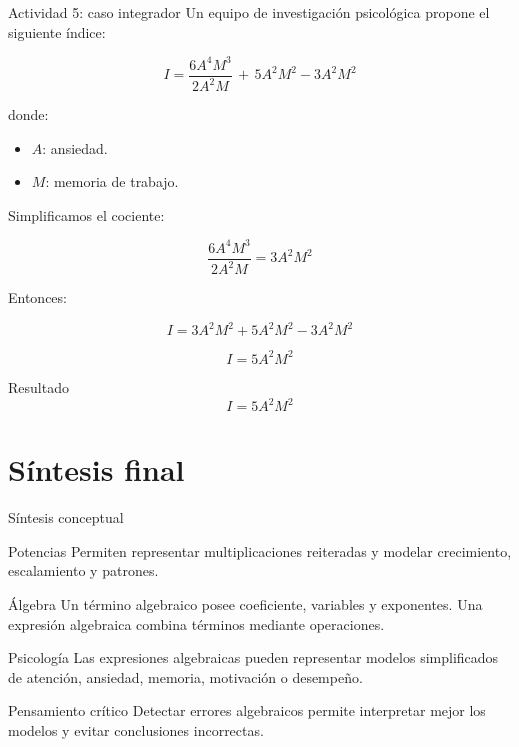 \documentclass[aspectratio=169]{beamer}
\begin{document}
	
	\begin{frame}{Actividad 5: caso integrador}
		Un equipo de investigación psicológica propone el siguiente índice:
		
		\[
		I=\frac{6A^4M^3}{2A^2M}\,+\,5A^2M^2-3A^2M^2
		\]
		
		donde:
		
		\begin{itemize}
			\item \(A\): ansiedad.
			\item \(M\): memoria de trabajo.
		\end{itemize}
		
		\pause
		
		Simplificamos el cociente:
		
		\[
		\frac{6A^4M^3}{2A^2M}
		=
		3A^2M^2
		\]
		
		\pause
		
		Entonces:
		
		\[
		I=3A^2M^2+5A^2M^2-3A^2M^2
		\]
		
		\pause
		
		\[
		I=5A^2M^2
		\]
		
		\pause
		
		\begin{block}{Resultado}
			\[
			I=5A^2M^2
			\]
		\end{block}
	\end{frame}
	
	\section{Síntesis final}
	
	\begin{frame}{Síntesis conceptual}
		\begin{block}{Potencias}
			Permiten representar multiplicaciones reiteradas y modelar crecimiento, escalamiento y patrones.
		\end{block}
		
		\pause
		
		\begin{block}{Álgebra}
			Un término algebraico posee coeficiente, variables y exponentes.  
			Una expresión algebraica combina términos mediante operaciones.
		\end{block}
		
		\pause
		
		\begin{block}{Psicología}
			Las expresiones algebraicas pueden representar modelos simplificados de atención, ansiedad, memoria, motivación o desempeño.
		\end{block}
		
		\pause
		
		\begin{block}{Pensamiento crítico}
			Detectar errores algebraicos permite interpretar mejor los modelos y evitar conclusiones incorrectas.
		\end{block}
	\end{frame}
	
\end{document}
